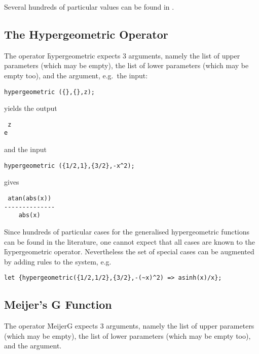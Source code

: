 Several hundreds of particular values can be found in \cite{Prudnikov:90c}.

\hypertarget{HYPERGEOMETRIC}{}
\subsection{The Hypergeometric Operator}

The operator \f{hypergeometric} expects 3 arguments, namely the 
list of upper parameters (which may be empty), the list of lower
parameters (which may be empty too), and the argument, e.g.\ the input:
\begin{verbatim}
hypergeometric ({},{},z);
\end{verbatim}
yields the output
\begin{verbatim}
 z
e
\end{verbatim}
and the input
\begin{verbatim}
hypergeometric ({1/2,1},{3/2},-x^2);
\end{verbatim}
gives
\begin{verbatim}
 atan(abs(x))
--------------
    abs(x)
\end{verbatim}


Since hundreds of particular cases for the generalised hypergeometric
functions can be found in the literature, one cannot expect that all
cases are known to the \f{hypergeometric} operator.
Nevertheless the set of special cases can be augmented by adding
rules to the \REDUCE{} system, e.g.
\begin{verbatim}
let {hypergeometric({1/2,1/2},{3/2},-(~x)^2) => asinh(x)/x};
\end{verbatim}

\subsection{Meijer's G Function}
\hypertarget{MEIJERG}{}

The operator \f{MeijerG} expects 3 arguments, namely the 
list of upper parameters (which may be empty), the list of lower
parameters (which may be empty too), and the argument.

